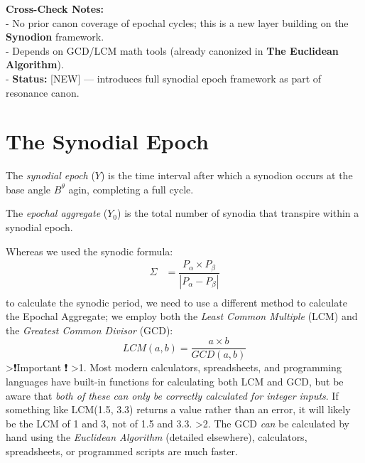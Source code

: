 \documentclass[
  letterpaper,
]{book}
\begin{document}
\textbf{Cross-Check Notes:}\\
- No prior canon coverage of epochal cycles; this is a new layer
building on the \textbf{Synodion} framework.\\
- Depends on GCD/LCM math tools (already canonized in \textbf{The
Euclidean Algorithm}).\\
- \textbf{Status:} {[}NEW{]} --- introduces full synodial epoch
framework as part of resonance canon.

\section{The Synodial Epoch}\label{the-synodial-epoch}

The \emph{synodial epoch} (\(Y\)) is the time interval after which a
synodion occurs at the base angle \(B^\theta\) agin, completing a full
cycle.

The \emph{epochal aggregate} (\(Y_0\)) is the total number of synodia
that transpire within a synodial epoch.

Whereas we used the synodic formula: \[
\begin{align}
\Sigma &= \dfrac{P_\alpha \times P_\beta}{|P_\alpha - P_\beta|} \\
\end{align}
\] to calculate the synodic period, we need to use a different method to
calculate the Epochal Aggregate; we employ both the \emph{Least Common
Multiple} (LCM) and the \emph{Greatest Common Divisor} (GCD): \[
LCM(a, b) = \dfrac{a \times b}{GCD(a, b)}
\] \textgreater❗️Important ❗️ \textgreater1. Most modern calculators,
spreadsheets, and programming languages have built-in functions for
calculating both LCM and GCD, but be aware that \emph{both of these can
only be correctly calculated for integer inputs}. If something like
LCM(1.5, 3.3) returns a value rather than an error, it will likely be
the LCM of 1 and 3, not of 1.5 and 3.3. \textgreater2. The GCD
\emph{can} be calculated by hand using the \emph{Euclidean Algorithm}
(detailed elsewhere), calculators, spreadsheets, or programmed scripts
are much faster.
\end{document}
